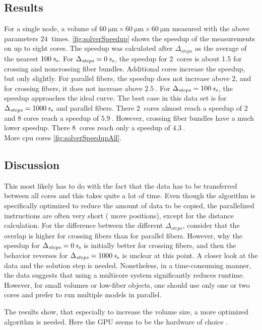 \subsection{Results}
For a single node, a volume of $\SI{60}{\micro\meter} \times \SI{60}{\micro\meter} \times \SI{60}{\micro\meter}$ measured with the above parameters $\SI{24}{}$ times.
\cref{fig:solverSpeedup} shows the speedup of the measurements on up to eight cores.
The speedup was calculated after $\Delta_{\mathit{steps}}$ as the average of the nearest $\SI{100}{\textnormal{$\mathit{s_{s}}$}}$.
For $\Delta_{\mathit{steps}} = \SI{0}{\textnormal{$\mathit{s_{s}}$}}$, the speedup for $\SI{2}{}$ cores is about 1.5 for crossing and noncrossing fiber bundles.
Additional cores increase the speedup, but only slightly.
For parallel fibers, the speedup does not increase above $2$, and for crossing fibers, it does not increase above $\SI{2.5}{}$.
For $\Delta_{\mathit{steps}} = \SI{100}{\textnormal{$\mathit{s_{s}}$}}$, the speedup approaches the ideal curve.
The best case in this data set is for $\Delta_{\mathit{steps}} = \SI{1000}{\textnormal{$\mathit{s_{s}}$}}$ and parallel fibers. There $\SI{2}{}$ cores almost reach a speedup of $2$ and 8 cores reach a speedup of $\SI{5.9}{}$.
However, crossing fiber bundles have a much lower speedup.
There $\SI{8}{}$ cores reach only a speedup of $\SI{4.3}{}$.
\\
\dummy{} More cpu cores \cref{fig:solverSpeedupAll}.
% 
\subsection{Discussion}
This most likely has to do with the fact that the data has to be transferred between all cores and this takes quite a lot of time.
Even though the algorithm is specifically optimized to reduce the amount of data to be copied, the parallelized instructions are often very short (\eg{} move positions), except for the distance calculation.
For the difference between the different $\Delta_{\mathit{steps}}$, consider that the overlap is higher for crossing fibers than for parallel fibers.
However, why the speedup for $\Delta_{\mathit{steps}}=\SI{0}{\textnormal{$\mathit{s_{s}}$}}$ is initially better for crossing fibers, and then the behavior reverses for $\Delta_{\mathit{steps}}=\SI{1000}{\textnormal{$\mathit{s_{s}}$}}$ is unclear at this point. 
A closer look at the data and the solution step is needed.
Nonetheless, in a time-consuming manner, the data suggests that using a multicore system significantly reduces runtime.
However, for small volumes or low-fiber objects, one should use only one or two cores and prefer to run multiple models in parallel.
\par
% 
The results show, that especially to increase the volume size, a more optimized algorithm is needed.
Here the \ac{GPU} seems to be the hardware of choice \cite{Karras2012}.
% 
% 
% 
